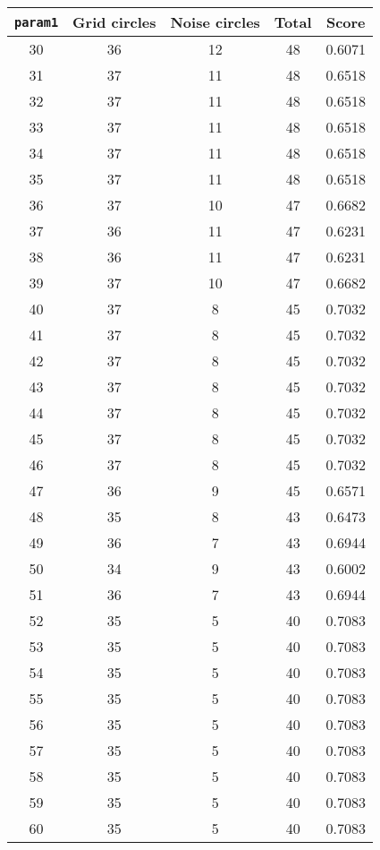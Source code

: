 \documentclass[letterpaper, 12pt]{article}
\begin{document}
\begin{longtable}{|c|c|c|c|c|}
\hline
\textbf{\texttt{param1}} & \textbf{Grid circles} & \textbf{Noise circles} & \textbf{Total} & \textbf{Score} \\
\hline
30 & 36 & 12 & 48 & 0.6071 \\
\hline
31 & 37 & 11 & 48 & 0.6518 \\
\hline
32 & 37 & 11 & 48 & 0.6518 \\
\hline
33 & 37 & 11 & 48 & 0.6518 \\
\hline
34 & 37 & 11 & 48 & 0.6518 \\
\hline
35 & 37 & 11 & 48 & 0.6518 \\
\hline
36 & 37 & 10 & 47 & 0.6682 \\
\hline
37 & 36 & 11 & 47 & 0.6231 \\
\hline
38 & 36 & 11 & 47 & 0.6231 \\
\hline
39 & 37 & 10 & 47 & 0.6682 \\
\hline
40 & 37 & 8 & 45 & 0.7032 \\
\hline
41 & 37 & 8 & 45 & 0.7032 \\
\hline
42 & 37 & 8 & 45 & 0.7032 \\
\hline
43 & 37 & 8 & 45 & 0.7032 \\
\hline
44 & 37 & 8 & 45 & 0.7032 \\
\hline
45 & 37 & 8 & 45 & 0.7032 \\
\hline
46 & 37 & 8 & 45 & 0.7032 \\
\hline
47 & 36 & 9 & 45 & 0.6571 \\
\hline
48 & 35 & 8 & 43 & 0.6473 \\
\hline
49 & 36 & 7 & 43 & 0.6944 \\
\hline
50 & 34 & 9 & 43 & 0.6002 \\
\hline
51 & 36 & 7 & 43 & 0.6944 \\
\hline
52 & 35 & 5 & 40 & 0.7083 \\
\hline
53 & 35 & 5 & 40 & 0.7083 \\
\hline
54 & 35 & 5 & 40 & 0.7083 \\
\hline
55 & 35 & 5 & 40 & 0.7083 \\
\hline
56 & 35 & 5 & 40 & 0.7083 \\
\hline
57 & 35 & 5 & 40 & 0.7083 \\
\hline
58 & 35 & 5 & 40 & 0.7083 \\
\hline
59 & 35 & 5 & 40 & 0.7083 \\
\hline
60 & 35 & 5 & 40 & 0.7083 \\
\hline

\end{longtable}
\end{document}
